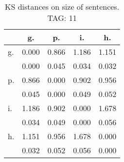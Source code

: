 \begin{table}[h!]
\begin{center}
\begin{tabular}{| l | c | c | c | c |}\hline
 & g. & p. & i. & h. \\\hline
g. & 0.000  & 0.866  & 1.186  & 1.151 \\\hline
 & 0.000  & 0.045  & 0.034  & 0.032 \\\hline
p. & 0.866  & 0.000  & 0.902  & 0.956 \\\hline
 & 0.045  & 0.000  & 0.049  & 0.052 \\\hline
i. & 1.186  & 0.902  & 0.000  & 1.678 \\\hline
 & 0.034  & 0.049  & 0.000  & 0.056 \\\hline
h. & 1.151  & 0.956  & 1.678  & 0.000 \\\hline
 & 0.032  & 0.052  & 0.056  & 0.000 \\\hline
\end{tabular}
\caption{KS distances on size of sentences. TAG: 11}
\end{center}
\end{table}